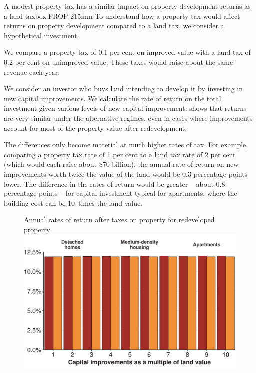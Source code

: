\begin{bigboxCsep*}{A modest property tax has a similar impact on property development returns as a land tax}{box:PROP-2}{15mm}
To understand how a property tax would affect returns on property development compared to a land tax, we consider a hypothetical investment.

We compare a property tax of 0.1 per cent on improved value with a land tax of 0.2 per cent on unimproved value. These taxes would raise about the same revenue each year. 

We consider an investor who buys land intending to develop it by investing in new capital improvements. We calculate the rate of return on the total investment given various levels of new capital improvement.  shows that returns are very similar under the alternative regimes, even in cases where improvements account for most of the property value after redevelopment. 

The differences only become material at much higher rates of tax. For example, comparing a property tax rate of 1 per cent to a land tax rate of 2 per cent (which would each raise about \$70 billion), the annual rate of return on new improvements worth twice the value of the land would be 0.3 percentage points lower. The difference in the rates of return would be greater – about 0.8 percentage points – for capital investment typical for apartments, where the building cost can be 10~times the land value.

\begin{figure}[H]
%
{Annual rates of return after taxes on property for redeveloped property}
\includegraphics[width=\columnwidth]{Property-taxes/atlas/figure/Figure9-1.pdf}

\end{figure}

\end{bigboxCsep*}

